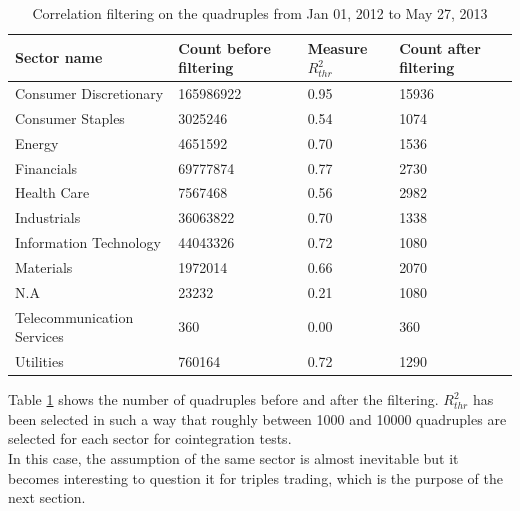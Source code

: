 \documentclass[11pt,a4,twosided,singlespacing,titlepagenumber=on]{scrreprt}
\numberwithin{equation}{chapter} %
\theoremstyle{remark}
\begin{document}
\begin{table}[H]
\centering
\begin{tabular}{llll}
\hline
\multicolumn{1}{|l|}{Sector name}     & \multicolumn{1}{|l|}{Count before filtering} & \multicolumn{1}{|l|}{Measure $R_{thr}^2$} & \multicolumn{1}{l|}{Count after filtering} \\ \hline
Consumer Discretionary						 &  165986922 & 0.95 & 15936 \\
Consumer Staples                   &  3025246 & 0.54 & 1074\\
Energy                             &  4651592 & 0.70 & 1536\\
Financials                         &  69777874 & 0.77 & 2730\\
Health Care                        &  7567468 & 0.56 & 2982\\
Industrials                        &  36063822 & 0.70 & 1338\\
Information Technology             & 44043326 & 0.72 & 1080\\
Materials                          & 1972014 & 0.66 & 2070\\
N.A                                & 23232 & 0.21 & 1080\\
Telecommunication Services         & 360 & 0.00 & 360\\
Utilities                          & 760164 & 0.72 & 1290\\
\hline
\end{tabular}
\caption{Correlation filtering on the quadruples from Jan 01, 2012 to May 27, 2013}
\label{corr_quad}
\end{table}
Table \ref{corr_quad} shows the number of quadruples before and after the filtering. $R^2_{thr}$ has been selected in such a way that roughly between 1000 and 10000 quadruples are selected for each sector for cointegration tests. \\
In this case, the assumption of the same sector is almost inevitable but it becomes interesting to question it for triples trading, which is the purpose of the next section.
\end{document}
